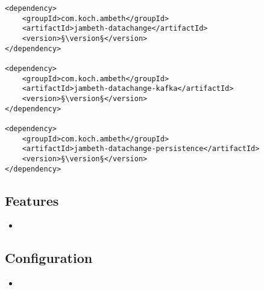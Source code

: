 \begin{lstlisting}[style=POM,caption={Maven modules to use \emph{Ambeth DataChange}}]
<dependency>
	<groupId>com.koch.ambeth</groupId>
	<artifactId>jambeth-datachange</artifactId>
	<version>§\version§</version>
</dependency>

<dependency>
	<groupId>com.koch.ambeth</groupId>
	<artifactId>jambeth-datachange-kafka</artifactId>
	<version>§\version§</version>
</dependency>

<dependency>
	<groupId>com.koch.ambeth</groupId>
	<artifactId>jambeth-datachange-persistence</artifactId>
	<version>§\version§</version>
</dependency>
\end{lstlisting}
\subsection{Features}
\begin{itemize}
	\item {}
\end{itemize}

\subsection{Configuration}
\begin{itemize}
	\item {}
\end{itemize}

